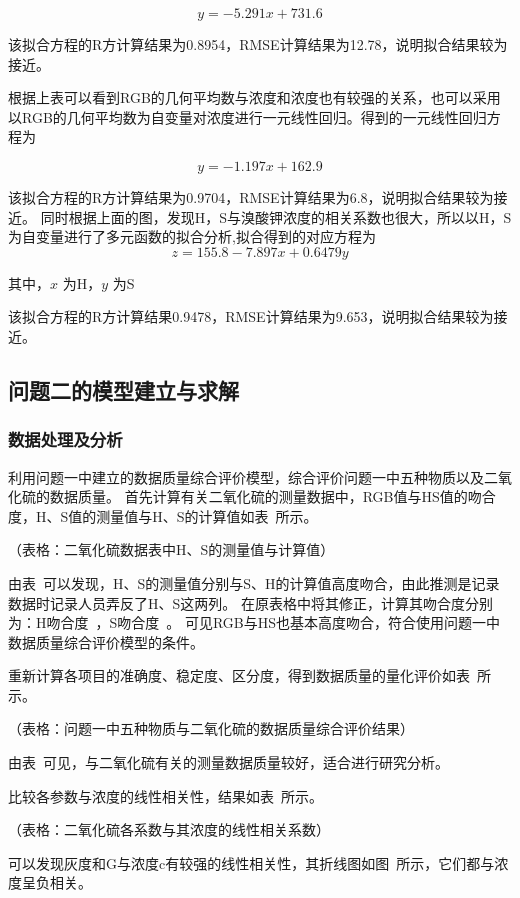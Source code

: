     $$y = -5.291 x + 731.6$$

    该拟合方程的R方计算结果为0.8954，RMSE计算结果为12.78，说明拟合结果较为接近。

    根据上表可以看到RGB的几何平均数与浓度和浓度也有较强的关系，也可以采用以RGB的几何平均数为自变量对浓度进行一元线性回归。得到的一元线性回归方程为

    $$y = -1.197 x + 162.9$$

    该拟合方程的R方计算结果为0.9704，RMSE计算结果为6.8，说明拟合结果较为接近。
    同时根据上面的图，发现H，S与溴酸钾浓度的相关系数也很大，所以以H，S为自变量进行了多元函数的拟合分析,拟合得到的对应方程为
    $$ z = 155.8 -7.897 x + 0.6479y $$

    其中，$x$ 为H，$y$ 为S

    该拟合方程的R方计算结果0.9478，RMSE计算结果为9.653，说明拟合结果较为接近。



\subsection{问题二的模型建立与求解}

\subsubsection{数据处理及分析}

利用问题一中建立的数据质量综合评价模型，综合评价问题一中五种物质以及二氧化硫的数据质量。
首先计算有关二氧化硫的测量数据中，RGB值与HS值的吻合度，H、S值的测量值与H、S的计算值如表~所示。

（表格：二氧化硫数据表中H、S的测量值与计算值）

由表~可以发现，H、S的测量值分别与S、H的计算值高度吻合，由此推测是记录数据时记录人员弄反了H、S这两列。
在原表格中将其修正，计算其吻合度分别为：H吻合度~，S吻合度~。
可见RGB与HS也基本高度吻合，符合使用问题一中数据质量综合评价模型的条件。

重新计算各项目的准确度、稳定度、区分度，得到数据质量的量化评价如表~所示。

（表格：问题一中五种物质与二氧化硫的数据质量综合评价结果）

由表~可见，与二氧化硫有关的测量数据质量较好，适合进行研究分析。

比较各参数与浓度的线性相关性，结果如表~所示。

（表格：二氧化硫各系数与其浓度的线性相关系数）

可以发现灰度和G与浓度c有较强的线性相关性，其折线图如图~所示，它们都与浓度呈负相关。

